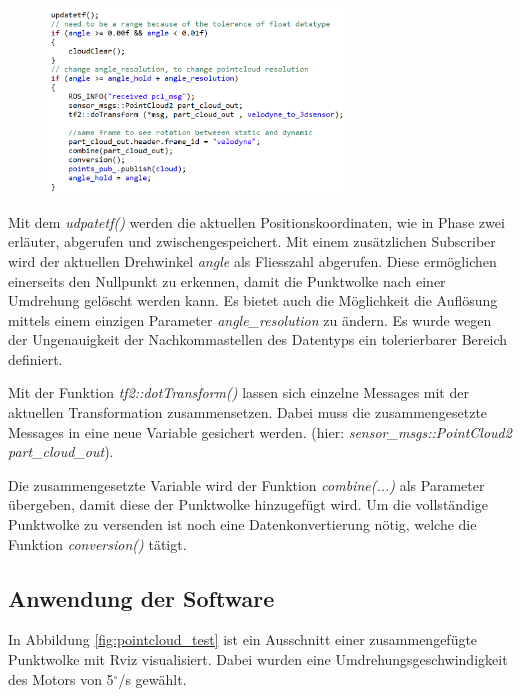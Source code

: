 \begin{figure}[H]
\includegraphics[width=0.7\textwidth]{resources/sourcecode/combine.png}
\end{figure}

Mit dem \textit{udpatetf()} werden die aktuellen Positionskoordinaten, wie in Phase zwei erläuter, abgerufen und zwischengespeichert. 	
Mit einem zusätzlichen Subscriber wird der aktuellen Drehwinkel \textit{angle} als Fliesszahl abgerufen. Diese ermöglichen einerseits den Nullpunkt zu erkennen, damit die Punktwolke nach einer Umdrehung gelöscht werden kann. Es bietet auch die Möglichkeit die Auflösung mittels einem einzigen Parameter \textit{angle\_resolution} zu ändern. Es wurde wegen der Ungenauigkeit der Nachkommastellen des Datentyps ein tolerierbarer Bereich definiert.
	
Mit der Funktion \textit{tf2::dotTransform()} lassen sich einzelne Messages mit der aktuellen Transformation zusammensetzen. Dabei muss die zusammengesetzte Messages in eine neue Variable gesichert werden. (hier:  \textit{sensor\_msgs::PointCloud2 part\_cloud\_out}). 

Die zusammengesetzte Variable wird der Funktion \textit{combine(...)} als Parameter übergeben, damit diese der Punktwolke hinzugefügt wird. Um die vollständige Punktwolke zu versenden ist noch eine Datenkonvertierung  nötig, welche die Funktion \textit{conversion()} tätigt.


\subsection{Anwendung der Software}

In Abbildung \ref{fig:pointcloud_test} ist ein Ausschnitt einer zusammengefügte Punktwolke mit Rviz visualisiert. Dabei wurden eine Umdrehungsgeschwindigkeit des Motors von 5$^\circ$/s gewählt. 

